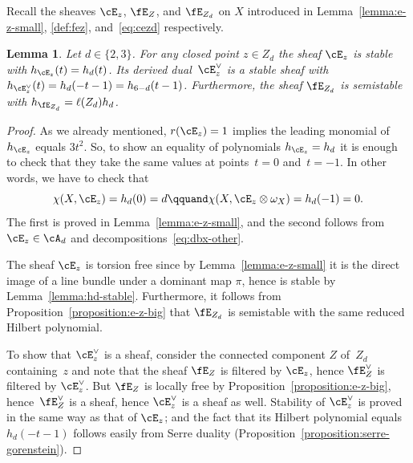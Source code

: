 \documentclass[11pt]{amsart}
\DeclareMathOperator{\RCHom}{\mathrm{R}\mathscr{H}\mathit{om}}
\theoremstyle{plain}
\newtheorem{lemma}[theorem]{Lemma}
\theoremstyle{definition}
\theoremstyle{remark}
\begin{document}
Recall the sheaves $\cE_z$, $\fE_Z$, and $\fE_{Z_d}$ on $X$ introduced 
in Lemma~\ref{lemma:e-z-small}, \eqref{def:fez}, and~\eqref{eq:cezd} respectively.

\begin{lemma}\label{lemma:hilbert-fz}
Let $d \in \{2, 3\}$.
For any closed point $z \in Z_d$ the sheaf $\cE_z$ is stable with $h_{\cE_z}(t) = h_d(t)$.
Its derived dual~$\cE_z^\vee$ is a stable sheaf with $h_{\cE_z^\vee}(t) = h_d(-t-1) = h_{6-d}(t-1)$.
Furthermore, the sheaf $\fE_{Z_d}$ is semistable with $h_{\fE_{Z_d}} = \ell(Z_d)h_d$.
\end{lemma}
\begin{proof}
As we already mentioned, $r(\cE_z) = 1$ implies the leading monomial of $h_{\cE_z}$ equals $3t^2$.
So, to show an equality of polynomials $h_{\cE_z} = h_d$ it is enough to check that they take the same values at points~$t = 0$ and~$t = -1$.
In other words, we have to check that 
\begin{equation*}
\chi(X,\cE_z) = h_d(0) = d
\qquand
\chi(X,\cE_z \otimes \omega_X) = h_d(-1) = 0.
\end{equation*}
The first is proved in Lemma~\ref{lemma:e-z-small}, and the second follows from $\cE_z \in \cA_d$ and decompositions~\eqref{eq:dbx-other}.


The sheaf $\cE_z$ is torsion free since by Lemma~\ref{lemma:e-z-small} it is the direct image of a line bundle 
under a dominant map $\pi$, hence is stable by Lemma~\ref{lemma:hd-stable}.
Furthermore, it follows from Proposition~\ref{proposition:e-z-big} that $\fE_{Z_d}$ is semistable with the same reduced Hilbert polynomial.

To show that $\cE_z^\vee$ is a sheaf, consider the connected component $Z$ of~$Z_d$ containing~$z$ and
note that the sheaf $\fE_Z$ is filtered by $\cE_z$, hence $\fE_Z^\vee$ is filtered by $\cE_z^\vee$.
But $\fE_Z$ is locally free by Proposition~\ref{proposition:e-z-big}, 
hence~$\fE_Z^\vee$ is a sheaf, hence $\cE_z^\vee$ is a sheaf as well.
% 
% 
% 
% 
Stability of $\cE_z^\vee$ is proved in the same way as that of $\cE_z$; and the fact that its Hilbert polynomial equals $h_d(-t-1)$ follows easily from Serre duality (Proposition~\ref{proposition:serre-gorenstein}).
\end{proof}
\end{document}
